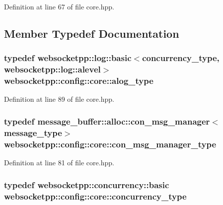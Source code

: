 Definition at line 67 of file core.\+hpp.



\subsection{Member Typedef Documentation}
\hypertarget{structwebsocketpp_1_1config_1_1core_a3b2c116aa4077f10b085f008b48028e2}{}
\subsubsection[{alog\+\_\+type}]{\setlength{\rightskip}{0pt plus 5cm}typedef {\bf websocketpp\+::log\+::basic}$<${\bf concurrency\+\_\+type}, {\bf websocketpp\+::log\+::alevel}$>$ {\bf websocketpp\+::config\+::core\+::alog\+\_\+type}}\label{structwebsocketpp_1_1config_1_1core_a3b2c116aa4077f10b085f008b48028e2}


Definition at line 89 of file core.\+hpp.

\hypertarget{structwebsocketpp_1_1config_1_1core_a9f19abdae7b74d1595b410ea47f3e0d8}{}
\subsubsection[{con\+\_\+msg\+\_\+manager\+\_\+type}]{\setlength{\rightskip}{0pt plus 5cm}typedef {\bf message\+\_\+buffer\+::alloc\+::con\+\_\+msg\+\_\+manager}$<${\bf message\+\_\+type}$>$ {\bf websocketpp\+::config\+::core\+::con\+\_\+msg\+\_\+manager\+\_\+type}}\label{structwebsocketpp_1_1config_1_1core_a9f19abdae7b74d1595b410ea47f3e0d8}


Definition at line 81 of file core.\+hpp.

\hypertarget{structwebsocketpp_1_1config_1_1core_a894e9dea6f10e890ea21a687607c2f70}{}
\subsubsection[{concurrency\+\_\+type}]{\setlength{\rightskip}{0pt plus 5cm}typedef {\bf websocketpp\+::concurrency\+::basic} {\bf websocketpp\+::config\+::core\+::concurrency\+\_\+type}}\label{structwebsocketpp_1_1config_1_1core_a894e9dea6f10e890ea21a687607c2f70}


